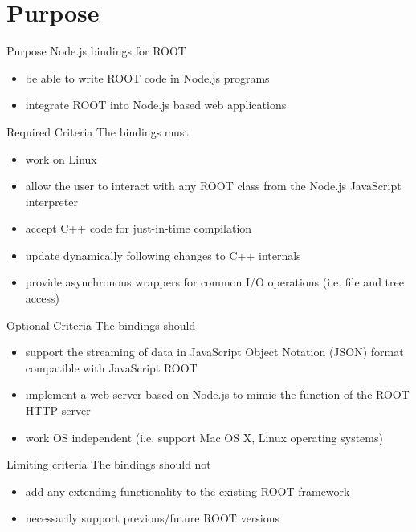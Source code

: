 \section{Purpose}
\begin{frame}{Purpose}
	Node.js bindings for ROOT
	 \begin{itemize}
	 	\item be able to write ROOT code in Node.js programs
	 	\item integrate ROOT into Node.js based web applications
	 \end{itemize}
\end{frame}

\begin{frame}{Required Criteria}
	The bindings must
	 \begin{itemize}
	 	\item work on Linux
	 	\item allow the user to interact with any ROOT class from the Node.js JavaScript interpreter
	 	\item accept C++ code for just-in-time compilation
	 	\item update dynamically following changes to C++ internals
	 	\item provide asynchronous wrappers for common I/O operations (i.e. file and tree access)
	 \end{itemize}
\end{frame}

\begin{frame}{Optional Criteria}
	The bindings should
	\begin{itemize}
		\item support the streaming of data in JavaScript Object Notation (JSON) format compatible with JavaScript ROOT
		\item implement a web server based on Node.js to mimic the function of the ROOT HTTP server
		\item work OS independent (i.e. support Mac OS X, Linux operating systems)
	\end{itemize}
\end{frame}

\begin{frame}{Limiting criteria} 
	The bindings should not
	\begin{itemize}
		\item add any extending functionality to the existing ROOT framework
		\item necessarily support previous/future ROOT versions
	\end{itemize}
\end{frame}